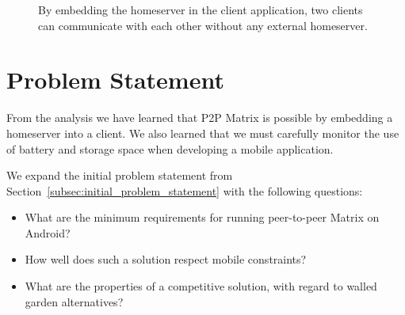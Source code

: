 \begin{figure}
	\centering
	\resizebox{!}{!}{}
	\caption{
		By embedding the homeserver in the client application, two clients can communicate with each other without any external homeserver.
	}%
	\label{fig:p2p-embed}
\end{figure}

\section{Problem Statement}\label{sec:problem_statement}

From the analysis we have learned that \ac{P2P} Matrix is possible by embedding a homeserver into a client.
We also learned that we must carefully monitor the use of battery and storage space when developing a mobile application.

We expand the initial problem statement from Section~\ref{subsec:initial_problem_statement} with the following questions:\\
\begin{itemize}
	\item What are the minimum requirements for running peer-to-peer Matrix on Android?
	\item How well does such a solution respect mobile constraints?
	\item What are the properties of a competitive solution, with regard to walled garden alternatives?
\end{itemize}
